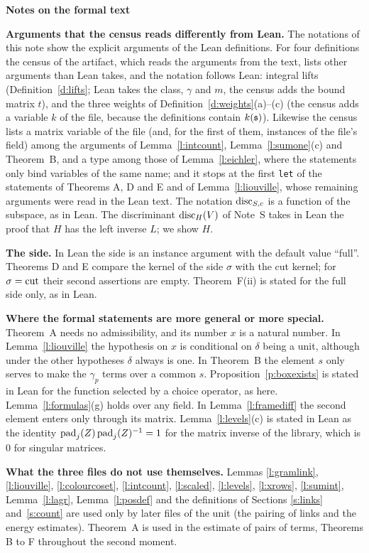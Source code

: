 \documentclass[11pt,a4paper]{article}
\newcommand{\sect}[2]{\refstepcounter{section}\label{#2}\par\addvspace{19pt plus 4pt minus 2pt}\Needspace{7\baselineskip}%
  \noindent\llap{{\fontsize{13.2}{16}\selectfont\bfseries\color{inkfaint}\thesection}\hspace{9pt}}%
  {\fontsize{13.2}{16}\selectfont\bfseries\color{ink}#1}\par\nopagebreak\vspace{-1pt}}
\newcommand{\subhead}[1]{\par\addvspace{9pt plus 2pt}\Needspace{4\baselineskip}\noindent\textbf{#1}\enspace\ignorespaces}
\theoremstyle{plainx}
\theoremstyle{uprightx}
\begin{document}
\sect{Notes on the formal text}{s:notes}
\subhead{Arguments that the census reads differently from Lean.} The notations of this note show the explicit
arguments of the Lean definitions. For four definitions the census of the artifact, which reads the arguments
from the text, lists other arguments than Lean takes, and the notation follows Lean: integral lifts
(Definition~\ref{d:lifts}; Lean takes the class, $\gamma$ and $m$, the census adds the bound matrix $t$), and the
three weights of Definition~\ref{d:weights}(a)--(c) (the census adds a variable $k$ of the file, because the
definitions contain $k(\mathfrak{s})$). Likewise the census lists a matrix variable of the file (and, for the first of them, instances of the file's
field) among the arguments of
Lemma~\ref{l:intcount}, Lemma~\ref{l:sumone}(c) and Theorem~B, and a type among those of Lemma~\ref{l:eichler}, where
the statements only bind variables of the same name; and it stops at the first \texttt{let} of the statements
of Theorems A, D and E and of Lemma~\ref{l:liouville}, whose remaining arguments were read in the Lean text. The
notation $\operatorname{disc}_{S,c}$ is a function of the subspace, as in Lean. The discriminant $\operatorname{disc}_{H}(V)$ of Note~S takes in
Lean the proof that $H$ has the left inverse $L$; we show $H$.

\subhead{The side.} In Lean the side is an instance argument with the default value ``full''. Theorems D and E
compare the kernel of the side $\sigma$ with the cut kernel; for $\sigma=\mathrm{cut}$ their second assertions are empty.
Theorem~F(ii) is stated for the full side only, as in Lean.

\subhead{Where the formal statements are more general or more special.} Theorem~A needs no admissibility, and
its number $x$ is a natural number. In Lemma~\ref{l:liouville} the hypothesis on $x$ is conditional on $\delta$
being a unit, although under the other hypotheses $\delta$ always is one. In Theorem~B the element $s$ only
serves to make the $\gamma_p$ terms over a common $s$. Proposition~\ref{p:boxexists} is stated in Lean for the
function selected by a choice operator, as here. Lemma~\ref{l:formulas}(g) holds over any field. In
Lemma~\ref{l:framediff} the second element enters only through its matrix. Lemma~\ref{l:levels}(c) is stated in
Lean as the identity $\operatorname{pad}_{j}(Z)\operatorname{pad}_{j}(Z)^{-1}=1$ for the matrix inverse of the library, which is $0$ for
singular matrices.

\subhead{What the three files do not use themselves.} Lemmas \ref{l:gramlink}, \ref{l:liouville},
\ref{l:colourcoset}, \ref{l:intcount}, \ref{l:scaled}, \ref{l:levels}, \ref{l:xrows}, \ref{l:sumint},
Lemma~\ref{l:lagr}, Lemma~\ref{l:posdef} and the definitions of Sections \ref{s:links} and~\ref{s:count} are used
only by later files of the unit (the pairing of links and the energy estimates). Theorem~A is used in the
estimate of pairs of terms, Theorems B to F throughout the second moment.
\end{document}
